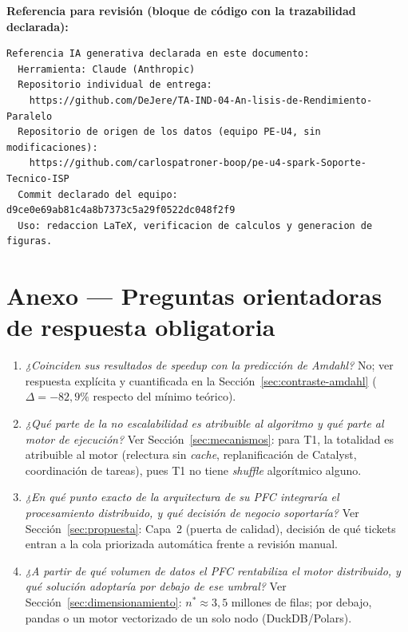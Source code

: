 \documentclass[11pt,a4paper]{article}
\begin{document}
\textbf{Referencia para revisi\'on (bloque de c\'odigo con la trazabilidad declarada):}
\begin{verbatim}
Referencia IA generativa declarada en este documento:
  Herramienta: Claude (Anthropic)
  Repositorio individual de entrega:
    https://github.com/DeJere/TA-IND-04-An-lisis-de-Rendimiento-Paralelo
  Repositorio de origen de los datos (equipo PE-U4, sin modificaciones):
    https://github.com/carlospatroner-boop/pe-u4-spark-Soporte-Tecnico-ISP
  Commit declarado del equipo: d9ce0e69ab81c4a8b7373c5a29f0522dc048f2f9
  Uso: redaccion LaTeX, verificacion de calculos y generacion de figuras.
\end{verbatim}

\section*{Anexo --- Preguntas orientadoras de respuesta obligatoria}
\label{sec:preguntas}

\begin{enumerate}
  \item \textit{¿Coinciden sus resultados de speedup con la predicci\'on de Amdahl?} No;
  ver respuesta expl\'icita y cuantificada en la Secci\'on~\ref{sec:contraste-amdahl}
  ($\Delta=-82{,}9\%$ respecto del m\'inimo te\'orico).
  \item \textit{¿Qu\'e parte de la no escalabilidad es atribuible al algoritmo y qu\'e parte
  al motor de ejecuci\'on?} Ver Secci\'on~\ref{sec:mecanismos}: para T1, la totalidad es
  atribuible al motor (relectura sin \textit{cache}, replanificaci\'on de Catalyst,
  coordinaci\'on de tareas), pues T1 no tiene \textit{shuffle} algor\'itmico alguno.
  \item \textit{¿En qu\'e punto exacto de la arquitectura de su PFC integrar\'ia el
  procesamiento distribuido, y qu\'e decisi\'on de negocio soportar\'ia?} Ver
  Secci\'on~\ref{sec:propuesta}: Capa~2 (puerta de calidad), decisi\'on de qu\'e tickets entran
  a la cola priorizada autom\'atica frente a revisi\'on manual.
  \item \textit{¿A partir de qu\'e volumen de datos el PFC rentabiliza el motor distribuido, y
  qu\'e soluci\'on adoptar\'ia por debajo de ese umbral?} Ver
  Secci\'on~\ref{sec:dimensionamiento}: $n^{*}\approx 3{,}5$ millones de filas; por debajo,
  pandas o un motor vectorizado de un solo nodo (DuckDB/Polars).
\end{enumerate}

\clearpage
\printbibliography[title={Referencias}]
\end{document}
